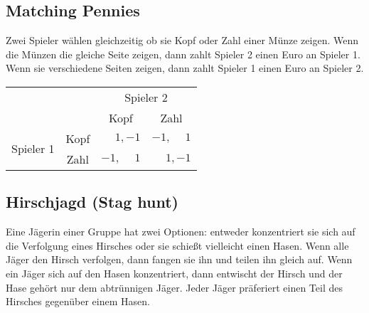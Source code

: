 \subsection{Matching Pennies}%
\label{sub:matching_pennies}

Zwei Spieler wählen gleichzeitig ob sie Kopf oder Zahl einer Münze zeigen.
Wenn die Münzen die gleiche Seite zeigen, dann zahlt Spieler 2 einen Euro an Spieler 1.
Wenn sie verschiedene Seiten zeigen, dann zahlt Spieler 1 einen Euro an Spieler 2.

\begin{center}
  \begin{tabular}{cccc}
    & & \multicolumn{2}{c}{Spieler 2}\\
    & & Kopf & Zahl\\
    \cmidrule{3-4}
    \multirow{2}{*}{Spieler 1}
      & Kopf & $\phantom{-}1, -1$ & $-1, \phantom{-}1$\\
    \cmidrule{3-4}
      & Zahl & $-1, \phantom{-}1$ & $\phantom{-}1, -1$\\
    \cmidrule{3-4}
  \end{tabular}
\end{center}

\subsection{Hirschjagd (Stag hunt)}%
\label{sub:hirschjagd_stag_hunt}

Eine Jägerin einer Gruppe hat zwei Optionen: entweder konzentriert sie sich auf die
Verfolgung eines Hirsches oder sie schießt vielleicht einen Hasen.
Wenn alle Jäger den Hirsch verfolgen, dann fangen sie ihn und teilen ihn gleich auf.
Wenn ein Jäger sich auf den Hasen konzentriert, dann entwischt der Hirsch und der Hase
gehört nur dem abtrünnigen Jäger.
Jeder Jäger präferiert einen Teil des Hirsches gegenüber einem Hasen.

